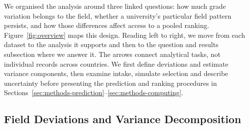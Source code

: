
We organised the analysis around three linked questions: how much grade variation belongs to the field, whether a university's particular field pattern persists, and how those differences affect access to a pooled ranking. Figure~\ref{fig:overview} maps this design. Reading left to right, we move from each dataset to the analysis it supports and then to the question and results subsection where we answer it. The arrows connect analytical tasks, not individual records across countries. We first define deviations and estimate variance components, then examine intake, simulate selection and describe uncertainty before presenting the prediction and ranking procedures in Sections~\ref{sec:methods-prediction}--\ref{sec:methods-computing}.
\subsection{Field Deviations and Variance Decomposition}
\label{sec:methods-decomposition}

